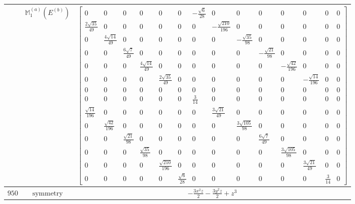 \documentclass[fleqn,8pt,landscape]{jsarticle}
\begin{document}
\begin{longtable}{ccc}
$  $ & $ \mathbb{M}_{1}^{(a)}(E^{(b)}) $ & $ \begin{bmatrix} 0 & 0 & 0 & 0 & 0 & 0 & - \frac{\sqrt{6}}{28} & 0 & 0 & 0 & 0 & 0 & 0 & 0 \\ \frac{2 \sqrt{35}}{49} & 0 & 0 & 0 & 0 & 0 & 0 & - \frac{\sqrt{210}}{196} & 0 & 0 & 0 & 0 & 0 & 0 \\ 0 & \frac{4 \sqrt{14}}{49} & 0 & 0 & 0 & 0 & 0 & 0 & - \frac{\sqrt{35}}{98} & 0 & 0 & 0 & 0 & 0 \\ 0 & 0 & \frac{6 \sqrt{7}}{49} & 0 & 0 & 0 & 0 & 0 & 0 & - \frac{\sqrt{21}}{98} & 0 & 0 & 0 & 0 \\ 0 & 0 & 0 & \frac{4 \sqrt{14}}{49} & 0 & 0 & 0 & 0 & 0 & 0 & - \frac{\sqrt{42}}{196} & 0 & 0 & 0 \\ 0 & 0 & 0 & 0 & \frac{2 \sqrt{35}}{49} & 0 & 0 & 0 & 0 & 0 & 0 & - \frac{\sqrt{14}}{196} & 0 & 0 \\ 0 & 0 & 0 & 0 & 0 & 0 & 0 & 0 & 0 & 0 & 0 & 0 & 0 & 0 \\ 0 & 0 & 0 & 0 & 0 & 0 & \frac{3}{14} & 0 & 0 & 0 & 0 & 0 & 0 & 0 \\ \frac{\sqrt{14}}{196} & 0 & 0 & 0 & 0 & 0 & 0 & \frac{3 \sqrt{21}}{49} & 0 & 0 & 0 & 0 & 0 & 0 \\ 0 & \frac{\sqrt{42}}{196} & 0 & 0 & 0 & 0 & 0 & 0 & \frac{3 \sqrt{105}}{98} & 0 & 0 & 0 & 0 & 0 \\ 0 & 0 & \frac{\sqrt{21}}{98} & 0 & 0 & 0 & 0 & 0 & 0 & \frac{6 \sqrt{7}}{49} & 0 & 0 & 0 & 0 \\ 0 & 0 & 0 & \frac{\sqrt{35}}{98} & 0 & 0 & 0 & 0 & 0 & 0 & \frac{3 \sqrt{105}}{98} & 0 & 0 & 0 \\ 0 & 0 & 0 & 0 & \frac{\sqrt{210}}{196} & 0 & 0 & 0 & 0 & 0 & 0 & \frac{3 \sqrt{21}}{49} & 0 & 0 \\ 0 & 0 & 0 & 0 & 0 & \frac{\sqrt{6}}{28} & 0 & 0 & 0 & 0 & 0 & 0 & \frac{3}{14} & 0 \end{bmatrix} $ \\ \hline
$ 950 $ & $ \text{symmetry} $ & $ - \frac{3 x^{2} z}{2} - \frac{3 y^{2} z}{2} + z^{3} $ \\

\end{longtable}
\end{document}
